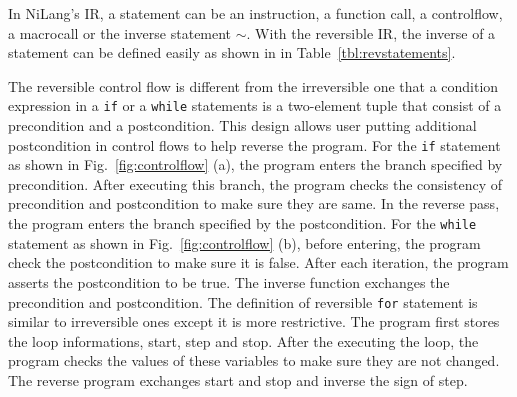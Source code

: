 \documentclass[aps,twocolumn,longbibliography,english,superscriptaddress,prr]{revtex4-1}
\newcommand{\<}{\langle}
\renewcommand{\>}{\rangle}
\newcommand{\Fig}[1]{Fig.~\ref{#1}}
\newcommand{\Tbl}[1]{Table~\ref{#1}}
\newcommand{\App}[1]{Appendix \ref{#1}}
\theoremstyle{definition}\newtheorem{definition}{\textit{Definition}}
\begin{document}
In NiLang's IR, a statement can be an instruction, a function call, a controlflow, a macrocall or the inverse statement $\sim$.
With the reversible IR, the inverse of a statement can be defined easily as shown in  in \Tbl{tbl:revstatements}.

The reversible control flow is different from the irreversible one that a condition expression in a \texttt{if} or a \texttt{while} statements is a two-element tuple that consist of a precondition and a postcondition. This design allows user putting additional postcondition in control flows to help reverse the program.
For the \texttt{if} statement as shown in \Fig{fig:controlflow} (a), the program enters the branch specified by precondition. After executing this branch, the program checks the consistency of precondition and postcondition to make sure they are same. In the reverse pass, the program enters the branch specified by the postcondition.
For the \texttt{while} statement as shown in \Fig{fig:controlflow} (b), before entering, the program check the postcondition to make sure it is false.
After each iteration, the program asserts the postcondition to be true. The inverse function exchanges the precondition and postcondition.
The definition of reversible \texttt{for} statement is similar to irreversible ones except it is more restrictive.
The program first stores the loop informations, start, step and stop. After the executing the loop, the program checks the values of these variables to make sure they are not changed. The reverse program exchanges start and stop and inverse the sign of step.
\end{document}
